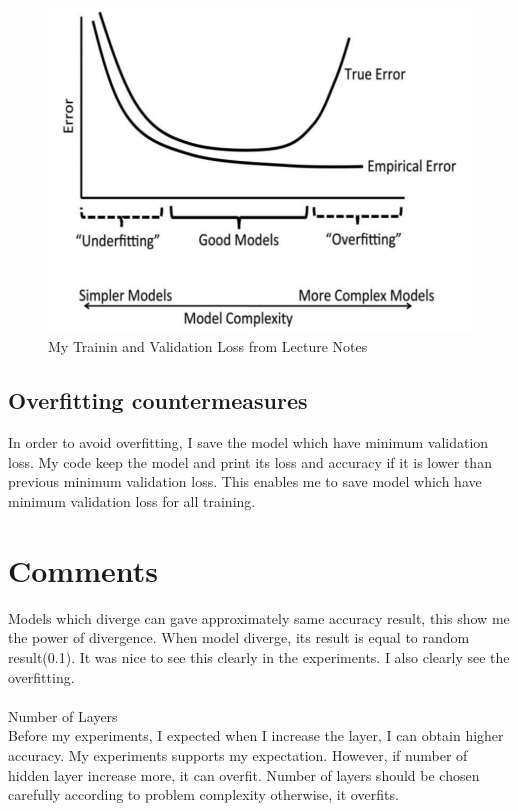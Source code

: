 \documentclass{article}
\begin{document}
\begin{figure}[H]
    \centering
    \includegraphics[width=\linewidth]{Lecture_notes_training_and_validation_curve.png}
    \caption{My Trainin and Validation Loss from Lecture Notes}
    \label{fig:lecture_notes}
\end{figure}



\subsection{Overfitting countermeasures}

In order to avoid overfitting, I save the model which have minimum validation loss. My code keep the model and print its loss and accuracy if it is lower than previous minimum validation loss. This enables me to save model which have minimum validation loss for all training.


\section{Comments}

Models which diverge can gave approximately same accuracy result, this show me the power of divergence. When model diverge, its result is equal to random result(0.1). It was nice to see this clearly in the experiments. I also clearly see the overfitting. \\ \\

Number of Layers \\
Before my experiments, I expected when I increase the layer, I can obtain higher accuracy. My experiments supports my expectation. However, if number of hidden layer increase more, it can overfit. Number of layers should be chosen carefully according to problem complexity otherwise, it overfits.  \\ \\
\end{document}
